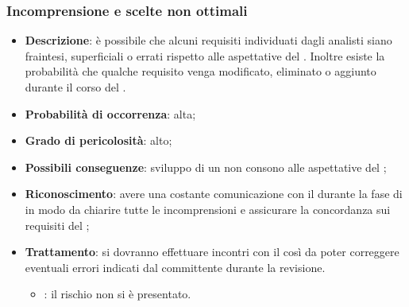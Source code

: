 \documentclass[PianoDiProgetto.tex]{subfiles}
\begin{document}
		\subsubsection{Incomprensione e scelte non ottimali}
			\label{sec:lr}
	\begin{itemize}
		\item \textbf{Descrizione}: è possibile che alcuni requisiti individuati dagli analisti siano fraintesi, superficiali o errati rispetto alle aspettative del  \PROPONENTE{}. Inoltre esiste la probabilità che qualche requisito venga modificato, eliminato o aggiunto durante il corso del .
		\item \textbf{Probabilità di occorrenza}: alta;
		\item \textbf{Grado di pericolosità}: alto;
		\item \textbf{Possibili conseguenze}: sviluppo di un  non consono alle aspettative del ;
		\item \textbf{Riconoscimento}: avere una costante comunicazione con il  \PROPONENTE{} durante la fase di \ARdoc{} in modo da chiarire tutte le incomprensioni e assicurare la concordanza sui requisiti del ;
		\item \textbf{Trattamento}: si dovranno effettuare incontri con il  \PROPONENTE{} così da poter correggere eventuali errori indicati dal committente durante la revisione.
		\begin{itemize}
				\item \PerAR : il rischio non si è presentato.
		\end{itemize}
	\end{itemize}	
	
\end{document}
